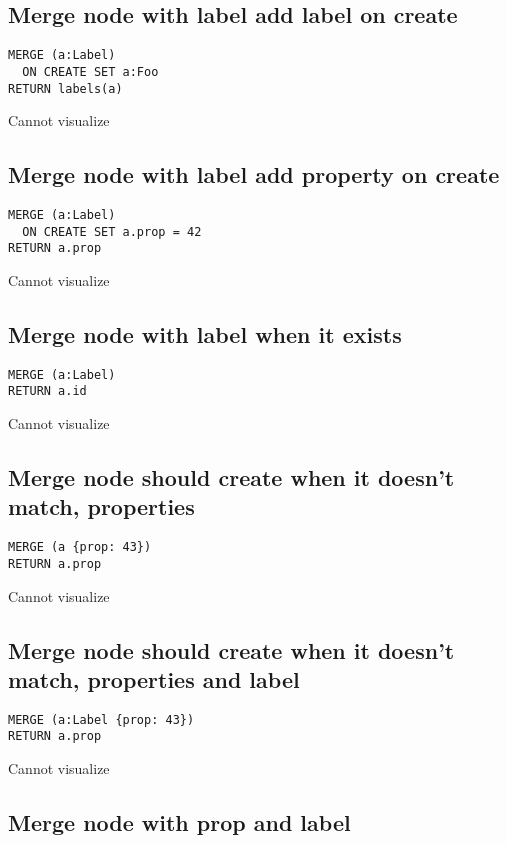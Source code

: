 \subsection{Merge node with label add label on create}

\begin{lstlisting}
MERGE (a:Label)
  ON CREATE SET a:Foo
RETURN labels(a)
\end{lstlisting}

Cannot visualize
\subsection{Merge node with label add property on create}

\begin{lstlisting}
MERGE (a:Label)
  ON CREATE SET a.prop = 42
RETURN a.prop
\end{lstlisting}

Cannot visualize
\subsection{Merge node with label when it exists}

\begin{lstlisting}
MERGE (a:Label)
RETURN a.id
\end{lstlisting}

Cannot visualize
\subsection{Merge node should create when it doesn't match, properties}

\begin{lstlisting}
MERGE (a {prop: 43})
RETURN a.prop
\end{lstlisting}

Cannot visualize
\subsection{Merge node should create when it doesn't match, properties and label}

\begin{lstlisting}
MERGE (a:Label {prop: 43})
RETURN a.prop
\end{lstlisting}

Cannot visualize
\subsection{Merge node with prop and label}

